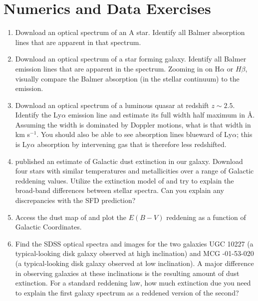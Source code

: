 \section{Numerics and Data Exercises}

\begin{enumerate}
\item Download an optical spectrum of an A star. Identify 
  all Balmer absorption lines that are apparent in that spectrum.
\item Download an optical spectrum of a star forming galaxy. Identify
all Balmer emission lines that are apparent in the spectrum. Zooming
in on H$\alpha$ or $H\beta$, visually compare the Balmer absorption
(in the stellar continuum) to the emission.
\item Download an optical spectrum of a luminous quasar at redshift $z\sim
2.5$. Identify the Ly$\alpha$ emission line and estimate its full
width half maximum in \AA. Assuming the width is dominated by Doppler
motions, what is that width in km s$^{-1}$. You should also be able to
see absorption lines blueward of Ly$\alpha$; this is Ly$\alpha$
absorption by intervening gas that is therefore less redshifted.
\item \citet{schlegel98a} published an estimate of Galactic dust
extinction in our galaxy. Download four stars with similar
temperatures and metallicities over a range of Galactic reddening
values. Utilize the extinction model of \citet{cardelli89a} and try to
explain the broad-band differences between stellar spectra. Can you
explain any discrepancies with the SFD prediction?
\item Access the dust map of \citet{schlegel98a} and plot the $E(B-V)$
    reddening as a function of Galactic Coordinates. 
\item Find the SDSS optical spectra and images for the two galaxies
UGC 10227 (a typical-looking disk galaxy observed at high inclination)
and MCG -01-53-020 (a typical-looking disk galaxy observed at low
inclination). A major difference in observing galaxies at these
inclinations is the resulting amount of dust extinction. For a
standard reddening law, how much extinction due you need to explain
the first galaxy spectrum as a reddened version of the second?
\end{enumerate}


  
